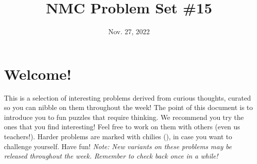 \documentclass[11pt]{scrartcl}
\begin{document}
\title{NMC Problem Set \#15} %
\date{Nov. 27, 2022} %
\maketitle

\section*{Welcome!}

This is a selection of interesting problems derived from curious thoughts, curated so you can nibble on them throughout the week! The point of this document is to introduce you to fun puzzles that require thinking. We recommend you try the ones that you find interesting! Feel free to work on them with others (even us teachers!). Harder problems are marked with chilies (\fullchili), in case you want to challenge yourself.
\newline\newline
Have fun! \textit{Note: New variants on these problems may be released throughout the week. Remember to check back once in a while!}
    
\end{document}
